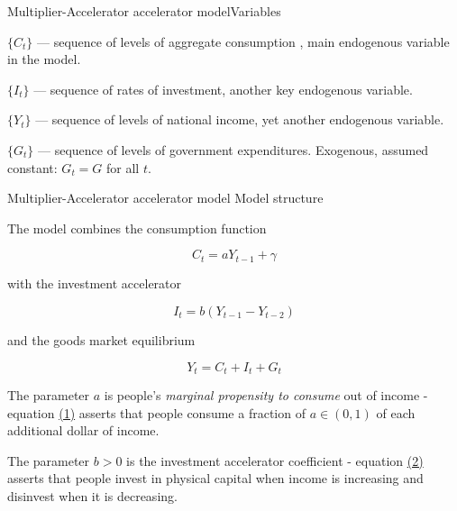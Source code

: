 \documentclass{beamer}
\newenvironment{mytemize}
{\vfill\itemize[nolistsep,itemsep=\fill,label=\color{blue}{$\triangleright$}]}
  {\enditemize}
\begin{document}
\begin{frame}{Multiplier-Accelerator accelerator model}{Variables}

\begin{mytemize}
\item
  \(\{C_t\}\) --- sequence of levels of aggregate consumption
  , main endogenous variable in the model.\\
\item
  \(\{I_t\}\) --- sequence of rates of investment, another key
  endogenous variable.\\
\item
  \(\{Y_t\}\) --- sequence of levels of national income, yet another
  endogenous variable.
\item
  \(\{G_t\}\) --- sequence of levels of government expenditures. Exogenous, assumed constant: \(G_t = G\) for all \(t\).\\
\end{mytemize}

\end{frame}

\begin{frame}{Multiplier-Accelerator accelerator model}{ Model structure}

The model combines the consumption function

 \[
C_t = a Y_{t-1} + \gamma \tag{1}
\]

with the investment accelerator

 \[
I_t = b (Y_{t-1} - Y_{t-2}) \tag{2}
\]

and the goods market equilibrium

 \[
Y_t = C_t + I_t + G_t \tag{3}
\]

\begin{mytemize}
 
\item
  The parameter $a$ is people's \emph{marginal propensity to consume}
  out of income - equation
  \protect\hyperlink{equation-consumption}{(1)} asserts that people
  consume a fraction of \(a \in (0,1)\) of each additional dollar of
  income.\\
\item
  The parameter \(b > 0\) is the investment accelerator coefficient -
  equation \protect\hyperlink{equation-accelerator}{(2)} asserts that
  people invest in physical capital when income is increasing and
  disinvest when it is decreasing.
\end{mytemize}

\end{frame}
\end{document}

